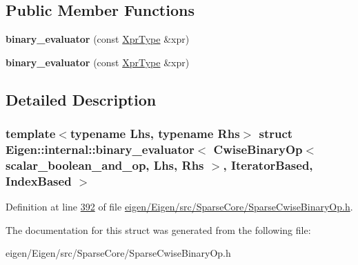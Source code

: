 \subsection*{Public Member Functions}
\begin{DoxyCompactItemize}
\item 
\mbox{\label{struct_eigen_1_1internal_1_1binary__evaluator_3_01_cwise_binary_op_3_01scalar__boolean__and__op_e9805903bdca4d8b3e2f0d1430158176_a92a63ea9d84cb5fa395ef722c620fbbc}} 
{\bfseries binary\+\_\+evaluator} (const \hyperlink{group___core___module_class_eigen_1_1_cwise_binary_op}{Xpr\+Type} \&xpr)
\item 
\mbox{\label{struct_eigen_1_1internal_1_1binary__evaluator_3_01_cwise_binary_op_3_01scalar__boolean__and__op_e9805903bdca4d8b3e2f0d1430158176_a92a63ea9d84cb5fa395ef722c620fbbc}} 
{\bfseries binary\+\_\+evaluator} (const \hyperlink{group___core___module_class_eigen_1_1_cwise_binary_op}{Xpr\+Type} \&xpr)
\end{DoxyCompactItemize}


\subsection{Detailed Description}
\subsubsection*{template$<$typename Lhs, typename Rhs$>$\newline
struct Eigen\+::internal\+::binary\+\_\+evaluator$<$ Cwise\+Binary\+Op$<$ scalar\+\_\+boolean\+\_\+and\+\_\+op, Lhs, Rhs $>$, Iterator\+Based, Index\+Based $>$}



Definition at line \hyperlink{eigen_2_eigen_2src_2_sparse_core_2_sparse_cwise_binary_op_8h_source_l00392}{392} of file \hyperlink{eigen_2_eigen_2src_2_sparse_core_2_sparse_cwise_binary_op_8h_source}{eigen/\+Eigen/src/\+Sparse\+Core/\+Sparse\+Cwise\+Binary\+Op.\+h}.



The documentation for this struct was generated from the following file\+:\begin{DoxyCompactItemize}
\item 
eigen/\+Eigen/src/\+Sparse\+Core/\+Sparse\+Cwise\+Binary\+Op.\+h\end{DoxyCompactItemize}
